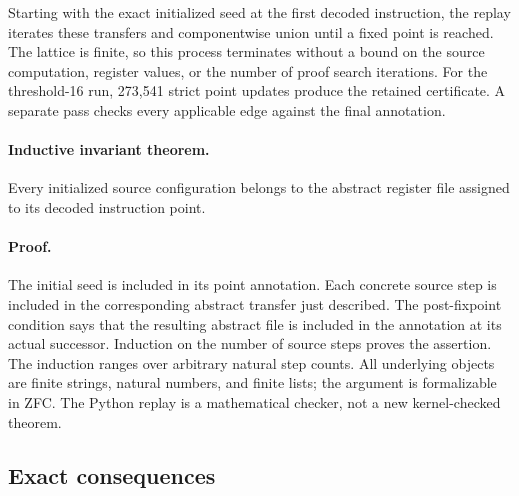 Starting with the exact initialized seed at the first decoded instruction,
the replay iterates these transfers and componentwise union until a fixed
point is reached.  The lattice is finite, so this process terminates without
a bound on the source computation, register values, or the number of proof
search iterations.  For the threshold-16 run, 273,541 strict point updates
produce the retained certificate.  A separate pass checks every applicable
edge against the final annotation.

\paragraph{Inductive invariant theorem.}
Every initialized source configuration belongs to the abstract register file
assigned to its decoded instruction point.

\paragraph{Proof.}
The initial seed is included in its point annotation.  Each concrete source
step is included in the corresponding abstract transfer just described.  The
post-fixpoint condition says that the resulting abstract file is included in
the annotation at its actual successor.  Induction on the number of source
steps proves the assertion.  The induction ranges over arbitrary natural
step counts.  All underlying objects are finite strings, natural numbers, and
finite lists; the argument is formalizable in ZFC.  The Python replay is a
mathematical checker, not a new kernel-checked theorem.

\subsection{Exact consequences}

